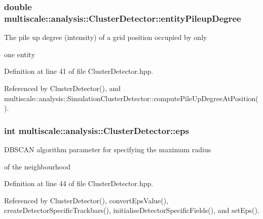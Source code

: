 \hypertarget{classmultiscale_1_1analysis_1_1ClusterDetector_aaa93a4b3a5a3c4279aa434669093ac40}{
\subsubsection[{entity\-Pileup\-Degree}]{\setlength{\rightskip}{0pt plus 5cm}double multiscale\-::analysis\-::\-Cluster\-Detector\-::entity\-Pileup\-Degree\hspace{0.3cm}{\ttfamily [protected]}}}\label{classmultiscale_1_1analysis_1_1ClusterDetector_aaa93a4b3a5a3c4279aa434669093ac40}
\begin{DoxyVerb}      The pile up degree (intensity) of a grid position occupied by only
\end{DoxyVerb}
 one entity 

Definition at line 41 of file Cluster\-Detector.\-hpp.



Referenced by Cluster\-Detector(), and multiscale\-::analysis\-::\-Simulation\-Cluster\-Detector\-::compute\-Pile\-Up\-Degree\-At\-Position().

\hypertarget{classmultiscale_1_1analysis_1_1ClusterDetector_a61e876f87d62245eada8f56d587d39cd}{
\subsubsection[{eps}]{\setlength{\rightskip}{0pt plus 5cm}int multiscale\-::analysis\-::\-Cluster\-Detector\-::eps\hspace{0.3cm}{\ttfamily [protected]}}}\label{classmultiscale_1_1analysis_1_1ClusterDetector_a61e876f87d62245eada8f56d587d39cd}
\begin{DoxyVerb}                        DBSCAN algorithm parameter for specifying the maximum radius
\end{DoxyVerb}
 of the neighbourhood 

Definition at line 44 of file Cluster\-Detector.\-hpp.



Referenced by Cluster\-Detector(), convert\-Eps\-Value(), create\-Detector\-Specific\-Trackbars(), initialise\-Detector\-Specific\-Fields(), and set\-Eps().

